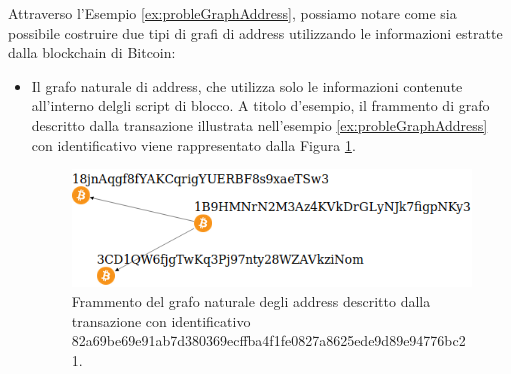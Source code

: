  Attraverso l'Esempio \ref{ex:probleGraphAddress}, possiamo notare come sia possibile costruire due tipi di grafi di address utilizzando le informazioni estratte dalla blockchain di Bitcoin:
 \begin{itemize}
   \item Il grafo naturale di address, che utilizza solo le informazioni contenute all'interno delgli script di blocco. A titolo d'esempio, il frammento di grafo descritto dalla transazione illustrata nell'esempio \ref{ex:probleGraphAddress} con  identificativo  viene rappresentato dalla Figura \ref{fig:addGrapjNatural}.
   \begin{figure}[H]
   \centering
   \includegraphics[scale=0.35]{images/exampleWithGraph/naturalAddressGrahScamTx.png}
   \caption{Frammento del grafo naturale degli address descritto dalla transazione con identificativo 82\-a69\-be69e\-91ab7\-d3803\-69ec\-ffba4f\-1fe08\-27a862\-5ede9\-d89e9\-4776b\-c21.\label{fig:addGrapjNatural}}
   \end{figure}


\end{itemize}
